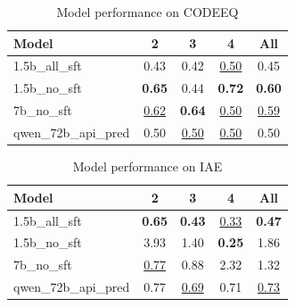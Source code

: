 \begin{table}[ht]
\centering
\begin{tabular}{lcccc}
\toprule
Model & 2 & 3 & 4 & All \\
\midrule
1.5b\_all\_sft & 0.43 & 0.42 & \underline{0.50} & 0.45 \\
1.5b\_no\_sft & \textbf{0.65} & 0.44 & \textbf{0.72} & \textbf{0.60} \\
7b\_no\_sft & \underline{0.62} & \textbf{0.64} & \underline{0.50} & \underline{0.59} \\
qwen\_72b\_api\_pred & 0.50 & \underline{0.50} & \underline{0.50} & 0.50 \\
\bottomrule
\end{tabular}
\caption{Model performance on CODEEQ}
\label{tab:codeeq}
\end{table}

\begin{table}[ht]
\centering
\begin{tabular}{lcccc}
\toprule
Model & 2 & 3 & 4 & All \\
\midrule
1.5b\_all\_sft & \textbf{0.65} & \textbf{0.43} & \underline{0.33} & \textbf{0.47} \\
1.5b\_no\_sft & 3.93 & 1.40 & \textbf{0.25} & 1.86 \\
7b\_no\_sft & \underline{0.77} & 0.88 & 2.32 & 1.32 \\
qwen\_72b\_api\_pred & 0.77 & \underline{0.69} & 0.71 & \underline{0.73} \\
\bottomrule
\end{tabular}
\caption{Model performance on IAE}
\label{tab:iae}
\end{table}

